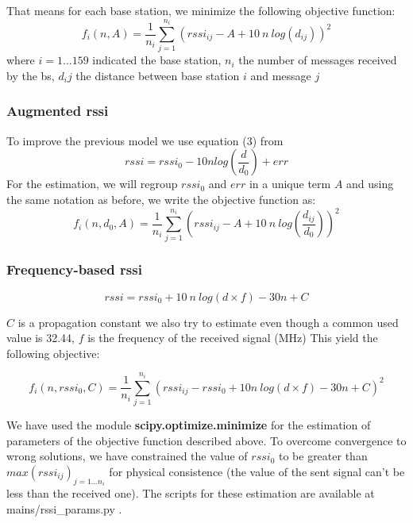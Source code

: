 \documentclass[twocolumn,2pt]{article}
\begin{document}
	That means for each base station, we minimize the following objective function:
	\begin{equation}
	\label{naive_rssi_objective}
	f_i(n, A) = \frac{1}{n_i} \sum_{j=1}^{n_i} (rssi_{ij} -A + 10 \ n \ log(d_{ij}))^2
	\end{equation}
	where $i=1\dots 159$ indicated the base station, $n_i$ the number of messages received by the bs, $d_ij$ the distance between base station $i$ and message $j$
	
	
	\subsubsection*{Augmented rssi}
	To improve the previous model we use equation (3) from \cite{Chiputa2018}
	\begin{equation}
	\label{augmented_rssi}
	rssi = rssi_0 - 10 n log(\frac{d}{d_0}) + err
	\end{equation}
	For the estimation, we will regroup $rssi_0$ and $err$ in a unique term $A$ and using the same notation as before, we write the objective function as:
	\begin{equation}
	\label{augmented_rssi_objective}
	f_i(n, d_0, A) = \frac{1}{n_i} \sum_{j=1}^{n_i} (rssi_{ij} -A + 10 \ n \ log(\frac{d_{ij}}{d_0}))^2
	\end{equation}
	
	
	\subsubsection*{Frequency-based rssi} 
	\begin{equation}
	\label{freq_rssi}
	rssi = rssi_0 + 10 \ n \ log(d \times f) - 30n + C
	\end{equation}
	
	$C$ is a propagation constant we also try to estimate even though a common used value is 32.44, $f$ is the frequency of the received signal (MHz) %
	This yield the following objective:
	
	\begin{equation}
	\label{freq_rssi_objective}
	f_i(n, rssi_0, C) = \frac{1}{n_i} \sum_{j=1}^{n_i} (rssi_{ij} - rssi_0 + 10n \ log(d \times f) - 30n + C)^2
	\end{equation}
	
	We have used the module \textbf{scipy.optimize.minimize} for the estimation of parameters of the objective function described above. To overcome convergence to wrong solutions, we have constrained the value of $rssi_0$ to be greater than $max(rssi_{ij})_{j=1 \dots n_i}$ for physical consistence (the value of the sent signal can't be less than the received one). The scripts for these estimation are available at mains/rssi\_params.py .
	
\end{document}
